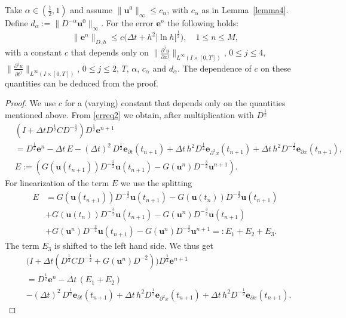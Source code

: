 \documentclass{siamltex}
\newcommand{\be}{\mathbf e}
\newcommand{\bu}{\mathbf u}
\begin{document}
{\begin{theorem} \label{mainthm}    Take $\alpha  \in (\tfrac12, 1)$ and assume $\|\bu^0\|_\infty \leq c_\alpha$, with $c_\alpha$ as in Lemma~\ref{lemma4}.
Define $d_\alpha:=\|D^{-\alpha}\bu^0\|_\infty$.  
For the error $\be^n$ the following holds:
\begin{equation} \label{optboound}
  \|\be^n\|_{D,h} \leq   c \big( \Delta t + h^2 |\ln h|^\frac12), \quad 1 \leq n \leq M,
\end{equation}
with a constant $c$ that depends only on $\|\frac{\partial^j u}{\partial  x^j}\|_{L^\infty(I\times[0,T])}$,  $0 \leq j \leq 4$, $\| \frac{\partial^j u}{\partial t^j}\|_{L^\infty(I\times[0,T])}$,  $0 \leq j \leq 2$,  $T$, $\alpha$, $c_\alpha$ and $d_\alpha$. The dependence of $c$ on these quantities can be deduced from the proof.
\end{theorem}
\begin{proof} We use $c$ for a (varying) constant that depends only on the quantities mentioned above. 
From \eqref{erreq2} we obtain, after multiplication with $D^\frac12$
\[ \begin{split}
  & (I+\Delta t D^\frac12C D^{-\frac12})D^\frac12\be^{n+1} \\ & =D^{\frac12}\be^n - \Delta t\, E    -(\Delta t)^2 \,D^\frac12 \be_{\partial t}(t_{n+1}) +  \Delta t\,  h^2 D^\frac12\be_{\partial^2 x}(t_{n+1})+ \Delta t\, h^2 D^{-\frac12}\be_{\partial x}(t_{n+1}), \\
  & E:= \left(G(\bu(t_{n+1}))D^{-\frac32}\bu(t_{n+1})- G(\bu^n)D^{-\frac32}\bu^{n+1}\right).
\end{split} \]
For linearization of the term $E$ we use the splitting
\begin{equation} \label{splitE}
 \begin{split}
  E & = G(\bu(t_{n+1}))D^{-\frac32}\bu(t_{n+1})- G(\bu(t_n))D^{-\frac32}\bu(t_{n+1}) \\
     & + G(\bu(t_n))D^{-\frac32}\bu(t_{n+1})- G(\bu^n)D^{-\frac32}\bu(t_{n+1}) \\
     & + G(\bu^n)D^{-\frac32}\bu(t_{n+1})- G(\bu^n)D^{-\frac32}\bu^{n+1} =:E_1+E_2+E_3.
 \end{split}
\end{equation}
The term $E_3$ is shifted to the left hand side. We thus get  
\begin{equation} \label{erreq8} \begin{split}
  & \big(I+\Delta t (D^\frac12C D^{-\frac12} +G(\bu^n)D^{-2})\big)D^{\frac12}\be^{n+1} \\ & =D^{\frac12}\be^n - \Delta t\, (E_1+E_2)  \\ &   -(\Delta t)^2 \,D^\frac12 \be_{\partial t}(t_{n+1}) +  \Delta t\,  h^2 D^\frac12\be_{\partial^2 x}(t_{n+1})+ \Delta t\, h^2 D^{-\frac12}\be_{\partial x}(t_{n+1}).

\end{split}
\end{equation}
\end{proof}}
\end{document}
